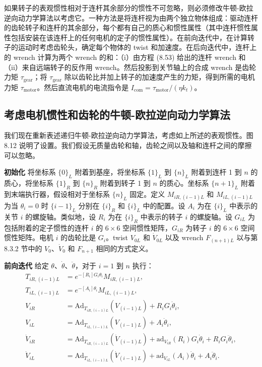 \documentclass[12pt,a4paper]{article}
\begin{document}
如果转子的表观惯性相对于连杆其余部分的惯性不可忽略，则必须修改牛顿-欧拉逆向动力学算法以考虑它。一种方法是将连杆视为由两个独立物体组成：驱动连杆的齿轮转子和连杆的其余部分，每个都有自己的质心和惯性属性（其中连杆惯性属性包括安装在该连杆上的任何电机的定子的惯性属性）。在前向迭代中，在计算转子的运动时考虑齿轮头，确定每个物体的 twist 和加速度。在后向迭代中，连杆上的 wrench 计算为两个 wrench 的和：（i）由方程 (8.53) 给出的连杆 wrench 和（ii）来自远端转子的反作用 wrench。然后投影到关节轴上的合成 wrench 是齿轮力矩 $\tau_{\text{gear}}$；将 $\tau_{\text{gear}}$ 除以齿轮比并加上转子的加速度产生的力矩，得到所需的电机力矩 $\tau_{\text{motor}}$。然后直流电机的电流指令是 $I_{\text{com}} = \tau_{\text{motor}}/(\eta k_t)$。

\subsection{考虑电机惯性和齿轮的牛顿-欧拉逆向动力学算法}
我们现在重新表述递归牛顿-欧拉逆向动力学算法，考虑如上所述的表观惯性。图 8.12 说明了设置。我们假设无质量齿轮和轴，齿轮之间以及轴和连杆之间的摩擦可以忽略。

\textbf{初始化} 将坐标系 $\{0\}_L$ 附着到基座，将坐标系 $\{1\}_L$ 到 $\{n\}_L$ 附着到连杆 1 到 $n$ 的质心，将坐标系 $\{1\}_R$ 到 $\{n\}_R$ 附着到转子 1 到 $n$ 的质心。坐标系 $\{n+1\}_L$ 附着到末端执行器，假设相对于坐标系 $\{n\}_L$ 固定。定义 $M_{iR,(i-1)L}$ 和 $M_{iL,(i-1)L}$ 为当 $\theta_i = 0$ 时 $\{i-1\}_L$ 分别在 $\{i\}_R$ 和 $\{i\}_L$ 中的配置。设 $A_i$ 为在 $\{i\}_L$ 中表示的关节 $i$ 的螺旋轴。类似地，设 $R_i$ 为在 $\{i\}_R$ 中表示的转子 $i$ 的螺旋轴。设 $G_{iL}$ 为包括附着的定子惯性的连杆 $i$ 的 $6 \times 6$ 空间惯性矩阵，$G_{iR}$ 为转子 $i$ 的 $6 \times 6$ 空间惯性矩阵。电机 $i$ 的齿轮比是 $G_i$。twist $V_{0L}$ 和 $\dot{V}_{0L}$ 以及 wrench $F_{(n+1)L}$ 以与第 8.3.2 节中的 $V_0$、$\dot{V}_0$ 和 $F_{n+1}$ 相同的方式定义。

\textbf{前向迭代} 给定 $\theta$、$\dot{\theta}$、$\ddot{\theta}$，对于 $i = 1$ 到 $n$ 执行：
\begin{align}
T_{iR,(i-1)L} &= e^{-[R_i]G_i\theta_i}M_{iR,(i-1)L}, \label{eq:8.103} \\
T_{iL,(i-1)L} &= e^{-[A_i]\theta_i}M_{iL,(i-1)L}, \label{eq:8.104} \\
V_{iR} &= \text{Ad}_{T_{iR,(i-1)L}}(V_{(i-1)L}) + R_i G_i \dot{\theta}_i, \label{eq:8.105} \\
V_{iL} &= \text{Ad}_{T_{iL,(i-1)L}}(V_{(i-1)L}) + A_i \dot{\theta}_i, \label{eq:8.106} \\
\dot{V}_{iR} &= \text{Ad}_{T_{iR,(i-1)L}}(\dot{V}_{(i-1)L}) + \text{ad}_{V_{iR}}(R_i)G_i \dot{\theta}_i + R_i G_i \ddot{\theta}_i, \label{eq:8.107} \\
\dot{V}_{iL} &= \text{Ad}_{T_{iL,(i-1)L}}(\dot{V}_{(i-1)L}) + \text{ad}_{V_{iL}}(A_i)\dot{\theta}_i + A_i \ddot{\theta}_i. \label{eq:8.108}
\end{align}
\end{document}
